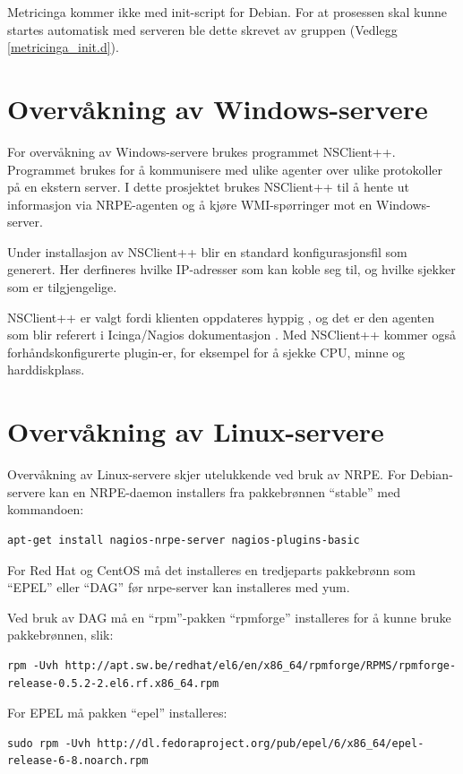 Metricinga kommer ikke med init-script for Debian. For at prosessen skal kunne startes automatisk med serveren ble dette skrevet av gruppen (Vedlegg \ref{metricinga_init.d}).
\section{Overvåkning av Windows-servere}
For overvåkning av Windows-servere brukes programmet NSClient++\cite{nsclientmain}. Programmet brukes for å kommunisere med ulike agenter over ulike protokoller på en ekstern server. I dette prosjektet brukes NSClient++ til å hente ut informasjon via NRPE-agenten og å kjøre WMI-spørringer mot en Windows-server. 

Under installasjon av NSClient++ blir en standard konfigurasjonsfil som generert. Her derfineres hvilke IP-adresser som kan koble seg til, og hvilke sjekker som er tilgjengelige.

NSClient++ er valgt fordi klienten oppdateres hyppig \cite{nsclient}, og det er den agenten som blir referert i Icinga/Nagios dokumentasjon \cite{icingawin}. Med NSClient++ kommer også forhåndskonfigurerte plugin-er, for eksempel for å sjekke CPU, minne og harddiskplass.

\section{Overvåkning av Linux-servere}\label{sec:overvaklinux}
Overvåkning av Linux-servere skjer utelukkende ved bruk av NRPE. For Debian-servere kan en NRPE-daemon installers fra pakkebrønnen ``stable'' med kommandoen:
\begin{lstlisting}[style=example]
apt-get install nagios-nrpe-server nagios-plugins-basic
\end{lstlisting}

For Red Hat og CentOS må det installeres en tredjeparts pakkebrønn som ``EPEL'' eller ``DAG'' før nrpe-server kan installeres med yum.

Ved bruk av DAG må en ``rpm''-pakken ``rpmforge'' installeres for å kunne bruke pakkebrønnen, slik:
\begin{lstlisting}[style=example]
rpm -Uvh http://apt.sw.be/redhat/el6/en/x86_64/rpmforge/RPMS/rpmforge-release-0.5.2-2.el6.rf.x86_64.rpm
\end{lstlisting}

For EPEL må pakken ``epel'' installeres:
\begin{lstlisting}[style=example]
sudo rpm -Uvh http://dl.fedoraproject.org/pub/epel/6/x86_64/epel-release-6-8.noarch.rpm
\end{lstlisting}

